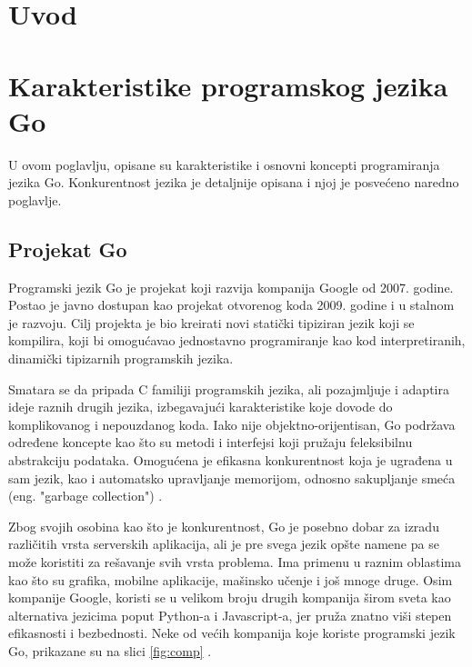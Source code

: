 \documentclass[12pt,oneside]{memoir}
\begin{document}
\frontmatter
\naslovna
\komisija
{}
\apstrakt
\tableofcontents*

\mainmatter

\chapter{Uvod}


\chapter{Karakteristike programskog jezika Go}

U ovom poglavlju, opisane su karakteristike i osnovni koncepti programiranja jezika Go.  Konkurentnost jezika je detaljnije opisana i njoj je posvećeno naredno poglavlje.

\section{Projekat Go}

Programski jezik Go je projekat koji razvija kompanija Google od 2007. godine. Postao je javno dostupan kao projekat otvorenog koda 2009. godine i u stalnom je razvoju. Cilj projekta je bio kreirati novi statički tipiziran jezik koji se kompilira, koji bi omogućavao jednostavno programiranje kao kod interpretiranih, dinamički tipizarnih programskih jezika. 

Smatara se da pripada C familiji programskih jezika, ali pozajmljuje i adaptira ideje raznih drugih jezika, izbegavajući karakteristike koje dovode do komplikovanog i nepouzdanog koda. Iako nije objektno-orijentisan, Go podržava određene koncepte kao što su metodi i interfejsi koji pružaju feleksibilnu abstrakciju podataka. Omogućena je efikasna konkurentnost koja je ugrađena u sam jezik, kao i automatsko upravljanje memorijom, odnosno sakupljanje smeća (eng. "garbage collection") \cite{bookGoProg}. 

Zbog svojih osobina kao što je konkurentnost, Go je posebno dobar za izradu različitih vrsta serverskih aplikacija, ali je pre svega jezik opšte namene pa se može koristiti za rešavanje svih vrsta problema. Ima primenu u raznim oblastima kao što su grafika, mobilne aplikacije, mašinsko učenje i još mnoge druge. Osim kompanije Google, koristi se u velikom broju drugih kompanija širom sveta kao alternativa jezicima poput Python-a i Javascript-a, jer pruža znatno viši stepen efikasnosti i bezbednosti. Neke od većih kompanija koje koriste programski jezik Go, prikazane su na slici \ref{fig:comp} \cite{goCompany}.
\end{document}
